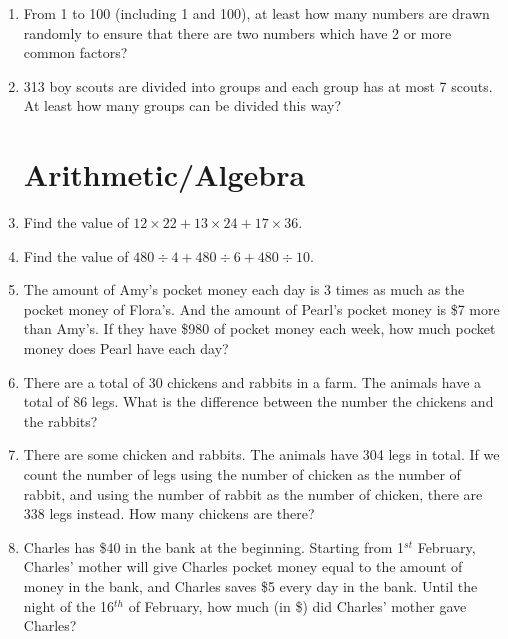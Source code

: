 \documentclass[11pt]{scrartcl}
\begin{document}
\begin{enumerate}
    \vspace{10cm}\item From 1 to 100 (including 1 and 100), at least how many numbers are drawn randomly to ensure that there are two numbers which have 2 or more common factors?
    
    \vspace{13cm}\item 313 boy scouts are divided into groups and each group has at most 7 scouts. At least how many groups can be divided this way?

    \vspace{10cm}
    \section{Arithmetic/Algebra}
    \item Find the value of $12 \times 22 + 13 \times 24 + 17 \times 36$.
    \vspace{10cm}\item Find the value of $480 \div 4 + 480 \div 6 + 480 \div 10$.
    
    \vspace{10cm}\item The amount of Amy's pocket money each day is 3 times as much as the pocket money of Flora's. And the amount of Pearl's pocket money is \$7 more than Amy's. If they have \$980 of pocket money each week, how much pocket money does Pearl have each day?
    
    
    \newpage\item There are a total of 30 chickens and rabbits in a farm. The animals have a total of 86 legs. What is the difference between the number the chickens and the rabbits?

    \vspace{10cm}\item There are some chicken and rabbits. The animals have 304 legs in total. If we count the number of legs using the number of chicken as the number of rabbit, and using the number of rabbit as the number of chicken, there are 338 legs instead. How many chickens are there?

    \vspace{10cm}\item Charles has \$40 in the bank at the beginning. Starting from 1$^{st}$ February, Charles' mother will give Charles pocket money equal to the amount of money in the bank, and Charles saves \$5 every day in the bank. Until the night of the 16$^{th}$ of February, how much (in \$) did Charles' mother gave Charles?


\end{enumerate}
\end{document}
